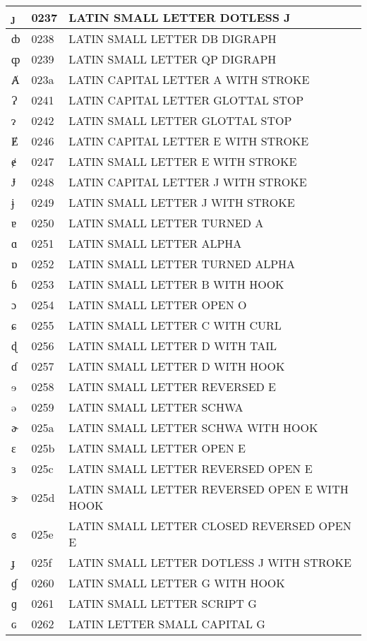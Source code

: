 \documentclass[12pt,letterpaper,openany]{book}
\begin{document}
\begin{center}
\begin{supertabular}{|m{0.25in}|m{0.5in}|m{4in}|}
ȷ & 0237 & LATIN SMALL LETTER DOTLESS J\\\hline
ȸ & 0238 & LATIN SMALL LETTER DB DIGRAPH\\\hline
ȹ & 0239 & LATIN SMALL LETTER QP DIGRAPH\\\hline
Ⱥ & 023a & LATIN CAPITAL LETTER A WITH STROKE\\\hline
Ɂ & 0241 & LATIN CAPITAL LETTER GLOTTAL STOP\\\hline
ɂ & 0242 & LATIN SMALL LETTER GLOTTAL STOP\\\hline
Ɇ & 0246 & LATIN CAPITAL LETTER E WITH STROKE\\\hline
ɇ & 0247 & LATIN SMALL LETTER E WITH STROKE\\\hline
Ɉ & 0248 & LATIN CAPITAL LETTER J WITH STROKE\\\hline
ɉ & 0249 & LATIN SMALL LETTER J WITH STROKE\\\hline
ɐ & 0250 & LATIN SMALL LETTER TURNED A\\\hline
ɑ & 0251 & LATIN SMALL LETTER ALPHA\\\hline
ɒ & 0252 & LATIN SMALL LETTER TURNED ALPHA\\\hline
ɓ & 0253 & LATIN SMALL LETTER B WITH HOOK\\\hline
ɔ & 0254 & LATIN SMALL LETTER OPEN O\\\hline
ɕ & 0255 & LATIN SMALL LETTER C WITH CURL\\\hline
ɖ & 0256 & LATIN SMALL LETTER D WITH TAIL\\\hline
ɗ & 0257 & LATIN SMALL LETTER D WITH HOOK\\\hline
ɘ & 0258 & LATIN SMALL LETTER REVERSED E\\\hline
ə & 0259 & LATIN SMALL LETTER SCHWA\\\hline
ɚ & 025a & LATIN SMALL LETTER SCHWA WITH HOOK\\\hline
ɛ & 025b & LATIN SMALL LETTER OPEN E\\\hline
ɜ & 025c & LATIN SMALL LETTER REVERSED OPEN E\\\hline
ɝ & 025d & LATIN SMALL LETTER REVERSED OPEN E WITH HOOK\\\hline
ɞ & 025e & LATIN SMALL LETTER CLOSED REVERSED OPEN E\\\hline
ɟ & 025f & LATIN SMALL LETTER DOTLESS J WITH STROKE\\\hline
ɠ & 0260 & LATIN SMALL LETTER G WITH HOOK\\\hline
ɡ & 0261 & LATIN SMALL LETTER SCRIPT G\\\hline
ɢ & 0262 & LATIN LETTER SMALL CAPITAL G\\\hline

\end{supertabular}
\end{center}
\end{document}
